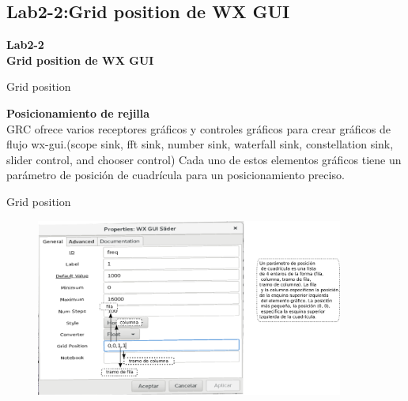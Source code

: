 \subsection{Lab2-2:Grid position de WX GUI}
\begin{frame}{}


\bfseries{\textrm{\LARGE Lab2-2\\ \LARGE Grid position de \newline WX GUI}}
\raggedright
\end{frame}

\begin{frame}{Grid position}


\textbf {Posicionamiento de rejilla} \\
\vspace{2mm}
GRC ofrece varios receptores gráficos y controles gráficos para crear gráficos de flujo wx-gui.(scope sink, fft sink, number sink, waterfall sink, constellation sink, slider control, and chooser control) Cada uno de estos elementos gráficos tiene un parámetro de posición de cuadrícula para un posicionamiento preciso.

\end{frame}

\begin{frame}{Grid position}

\begin{figure}[H]
\centering
\vspace{-3mm}
\includegraphics[width=0.9\textwidth]{parte1/lab2-2/pdf/lab0_1.pdf}


\end{figure}

\end{frame}


